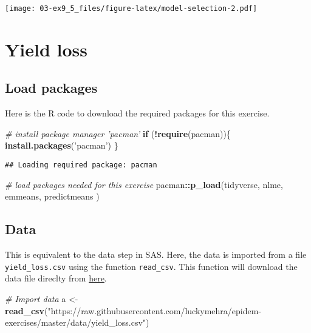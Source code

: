 \documentclass[]{book}
\newenvironment{Shaded}{\begin{snugshade}}{\end{snugshade}}
\newcommand{\CommentTok}[1]{\textcolor[rgb]{0.56,0.35,0.01}{\textit{#1}}}
\newcommand{\ControlFlowTok}[1]{\textcolor[rgb]{0.13,0.29,0.53}{\textbf{#1}}}
\newcommand{\KeywordTok}[1]{\textcolor[rgb]{0.13,0.29,0.53}{\textbf{#1}}}
\newcommand{\NormalTok}[1]{#1}
\newcommand{\OperatorTok}[1]{\textcolor[rgb]{0.81,0.36,0.00}{\textbf{#1}}}
\newcommand{\StringTok}[1]{\textcolor[rgb]{0.31,0.60,0.02}{#1}}
\begin{document}
\texttt{[image: 03-ex9\_5\_files/figure-latex/model-selection-2.pdf]}

\hypertarget{yieldloss}{%
\chapter{Yield loss}\label{yieldloss}}

\hypertarget{load-packages-3}{%
\section{Load packages}\label{load-packages-3}}

Here is the R code to download the required packages for this exercise.

\begin{Shaded}
\begin{Highlighting}[]
\CommentTok{# install package manager 'pacman'}
\ControlFlowTok{if}\NormalTok{ (}\OperatorTok{!}\KeywordTok{require}\NormalTok{(pacman))\{}
  \KeywordTok{install.packages}\NormalTok{(}\StringTok{'pacman'}\NormalTok{)}
\NormalTok{\}}
\end{Highlighting}
\end{Shaded}

\begin{verbatim}
## Loading required package: pacman
\end{verbatim}

\begin{Shaded}
\begin{Highlighting}[]
\CommentTok{# load packages needed for this exercise}
\NormalTok{pacman}\OperatorTok{::}\KeywordTok{p_load}\NormalTok{(tidyverse,}
\NormalTok{       nlme,}
\NormalTok{       emmeans,}
\NormalTok{       predictmeans}
\NormalTok{       )}
\end{Highlighting}
\end{Shaded}

\hypertarget{data-2}{%
\section{Data}\label{data-2}}

This is equivalent to the data step in SAS. Here, the data is imported from a file \texttt{yield\_loss.csv} using the function \texttt{read\_csv}. This function will download the data file direclty from \href{https://raw.githubusercontent.com/luckymehra/epidem-exercises/master/data/yield_loss.csv}{here}.

\begin{Shaded}
\begin{Highlighting}[]
\CommentTok{# Import data}
\NormalTok{a <-}\StringTok{ }\KeywordTok{read_csv}\NormalTok{(}\StringTok{"https://raw.githubusercontent.com/luckymehra/epidem-exercises/master/data/yield_loss.csv"}\NormalTok{)}
\end{Highlighting}
\end{Shaded}
\end{document}
